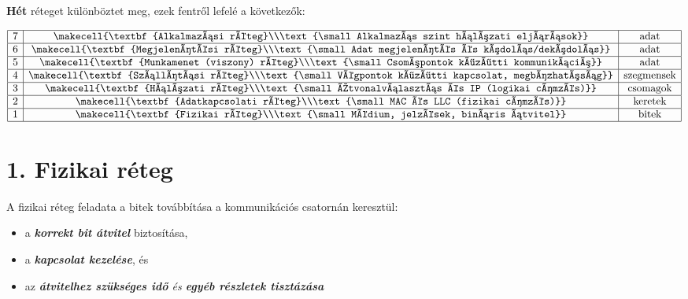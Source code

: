 \documentclass[12pt]{article}
\begin{document}
	\noindent \textbf{Hét} réteget különböztet meg, ezek fentről lefelé a következők:
    \begin{center}
        \renewcommand{\arraystretch}{2}
        $\begin{array}{|l|c|c|}
            \hline
            7 & \makecell{\textbf{Alkalmazási réteg}\\\text{\small Alkalmazás szint hálózati eljárások}} & \text{adat} \\ \hline
            6 & \makecell{\textbf{Megjelenítési réteg}\\\text{\small Adat megjelenítés és kódolás/dekódolás}} & \text{adat} \\ \hline
            5 & \makecell{\textbf{Munkamenet (viszony) réteg}\\\text{\small Csomópontok közötti kommunikáció}} & \text{adat} \\ \hline
            4 & \makecell{\textbf{Szállítási réteg}\\\text{\small Végpontok közötti kapcsolat, megbízhatóság}} & \text{szegmensek} \\ \hline
            3 & \makecell{\textbf{Hálózati réteg}\\\text{\small Útvonalválasztás és IP (logikai címzés)}} & \text{csomagok} \\ \hline
            2 & \makecell{\textbf{Adatkapcsolati réteg}\\\text{\small MAC és LLC (fizikai címzés)}} & \text{keretek} \\ \hline
            1 & \makecell{\textbf{Fizikai réteg}\\\text{\small Médium, jelzések, bináris átvitel}} & \text{bitek} \\ \hline
        \end{array}$
        \renewcommand{\arraystretch}{1}
    \end{center}
\newpage
	\section*{1. Fizikai réteg}

	A fizikai réteg feladata a bitek továbbítása a kommunikációs csatornán keresztül:
    \begin{itemize}[leftmargin=7.5mm]
        \renewcommand{\labelitemi}{$\vcenter{\hbox{\tiny$\bullet$}}$}
        \item a \emph{\textbf{\small korrekt bit átvitel}} biztosítása,
        \item a \emph{\textbf{\small kapcsolat kezelése}}, és
        \item az \emph{\textbf{\small átvitelhez szükséges idő} és \textbf{\small egyéb részletek tisztázása}}\\
    \end{itemize}
\end{document}
